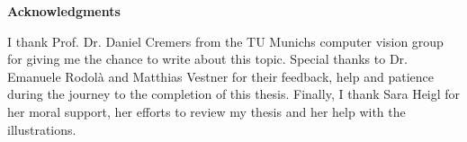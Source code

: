 \clearemptydoublepage
{}
{}	



\vspace*{2cm}

\begin{center}
{\Large \bfseries Acknowledgments}
\end{center}

\vspace{1cm}




I thank Prof. Dr. Daniel Cremers from the TU Munichs computer vision group for giving me the chance to write about this topic.
Special thanks to Dr. Emanuele Rodol\`{a} and Matthias Vestner for their feedback, help and patience during the journey to the completion of this thesis.
Finally, I thank Sara Heigl for her moral support, her efforts to review my thesis and her help with the illustrations.

